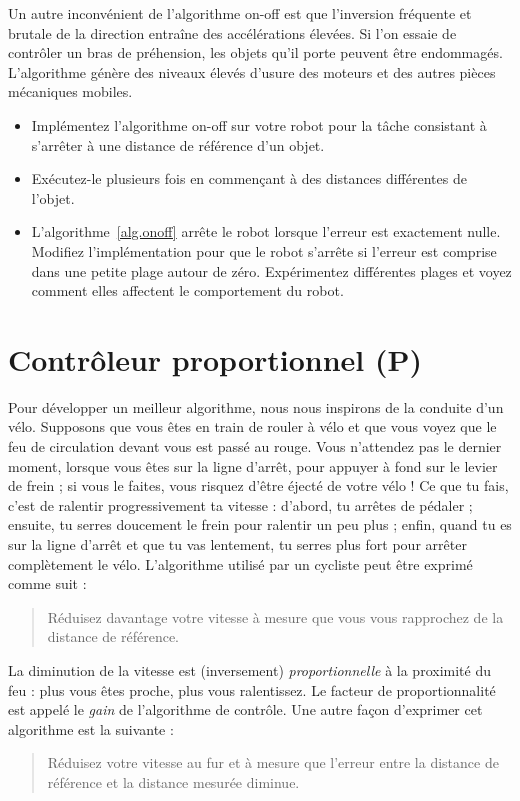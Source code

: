 Un autre inconvénient de l'algorithme on-off est que l'inversion fréquente et brutale de la direction entraîne des accélérations élevées. Si l'on essaie de contrôler un bras de préhension, les objets qu'il porte peuvent être endommagés. L'algorithme génère des niveaux élevés d'usure des moteurs et des autres pièces mécaniques mobiles.

\begin{framed}
\begin{itemize}
\item Implémentez l'algorithme on-off sur votre robot pour la tâche consistant à s'arrêter à une distance de référence d'un objet.
\item Exécutez-le plusieurs fois en commençant à des distances différentes de l'objet.
\item L'algorithme~\ref{alg.onoff} arrête le robot lorsque l'erreur est exactement nulle. Modifiez l'implémentation pour que le robot s'arrête si l'erreur est comprise dans une petite plage autour de zéro. Expérimentez différentes plages et voyez comment elles affectent le comportement du robot.
\end{itemize}
\end{framed}

\section{Contrôleur proportionnel (P)}\label{s.p}

Pour développer un meilleur algorithme, nous nous inspirons de la conduite d'un vélo. Supposons que vous êtes en train de rouler à vélo et que vous voyez que le feu de circulation devant vous est passé au rouge. Vous n'attendez pas le dernier moment, lorsque vous êtes sur la ligne d'arrêt, pour appuyer à fond sur le levier de frein ; si vous le faites, vous risquez d'être éjecté de votre vélo ! Ce que tu fais, c'est de ralentir progressivement ta vitesse : d'abord, tu arrêtes de pédaler ; ensuite, tu serres doucement le frein pour ralentir un peu plus ; enfin, quand tu es sur la ligne d'arrêt et que tu vas lentement, tu serres plus fort pour arrêter complètement le vélo. L'algorithme utilisé par un cycliste peut être exprimé comme suit :
\begin{quote}
\normalsize\noindent{}Réduisez davantage votre vitesse à mesure que vous vous rapprochez de la distance de référence.
\end{quote}
La diminution de la vitesse est (inversement) \emph{proportionnelle} à la proximité du feu : plus vous êtes proche, plus vous ralentissez. Le facteur de proportionnalité est appelé le \emph{gain} de l'algorithme de contrôle. Une autre façon d'exprimer cet algorithme est la suivante :
\begin{quote}
\normalsize\noindent{}Réduisez votre vitesse au fur et à mesure que l'erreur entre la distance de référence et la distance mesurée diminue.
\end{quote}

